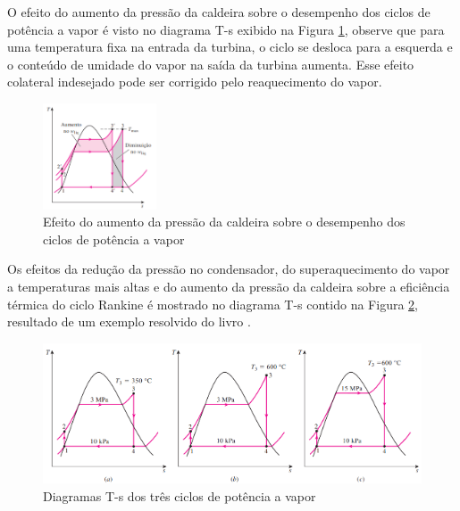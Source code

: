 \documentclass[
	article,			%
	11pt,				%
	oneside,			%
	a4paper,			%
	english,			%
	brazil,				%
	sumario=tradicional
	]{abntex2}
\begin{document}

O efeito do aumento da pressão da caldeira sobre o desempenho dos ciclos de potência a vapor é visto no diagrama T-s exibido na Figura \ref{fig:pressao-caldeira}, observe que para uma temperatura fixa na entrada da turbina, o ciclo se desloca para a esquerda e o conteúdo de umidade do vapor na saída da turbina aumenta. Esse efeito colateral indesejado pode ser corrigido pelo reaquecimento do vapor.

\begin{figure}[h]
	\centering
	\includegraphics[width=0.3\textwidth]{./images/pressao-caldeira.png}
	\caption{Efeito do aumento da pressão da caldeira sobre o desempenho dos ciclos de potência a vapor}
	\label{fig:pressao-caldeira}
\end{figure}

Os efeitos da redução da pressão no condensador, do superaquecimento do vapor a temperaturas mais altas e do aumento da pressão da caldeira sobre a eficiência térmica do ciclo Rankine é mostrado no diagrama T-s contido na Figura \ref{fig:diagramas-ts-3-ciclos}, resultado de um exemplo resolvido do livro \cite{cengel-2008}.

\begin{figure}[h]
	\centering
	\includegraphics[width=1.0\textwidth]{./images/diagramas-ts-3-ciclos.png}
	\caption{Diagramas T-s dos três ciclos de potência a vapor}
	\label{fig:diagramas-ts-3-ciclos}
\end{figure}
\end{document}
